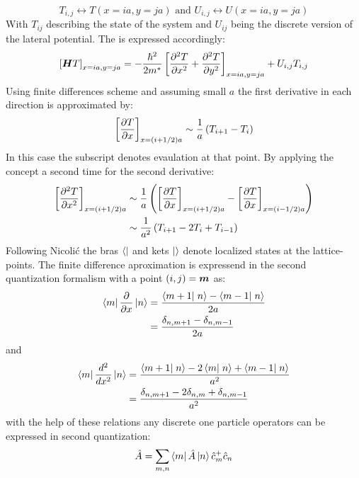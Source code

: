 \begin{equation}
  T_{i,j} \leftrightarrow T(x=ia,y=ja) \mbox{ and } U_{i,j}\leftrightarrow U(x=ia,y=ja)
  \label{FunctionDescrete}
\end{equation}
With $T_{ij}$ describing the state of the system and $U_{ij}$ being the discrete version of the lateral potential.
The \hamil{} is expressed accordingly:
\begin{equation}
  \left[\boldsymbol{H}T\right]_{x=ia,y=ja}=-\frac{\hbar^{2}}{2m^*}\left[\frac{\partial^2 T}{\partial x^2}+\frac{\partial^2 T}{\partial y^2}\right]_{x=ia,y=ja}+U_{i,j}T_{i,j}
  \label{DiscreteHamil}
\end{equation}
Using finite differences scheme and assuming small $a$ the first derivative in each direction is approximated by:
\begin{equation}
  \left[\frac{\partial T}{\partial x}\right]_{x=(i+1/2)a} \sim  \frac{1}{a}\left(T_{i+1}-T_{i}\right)
  \label{ApproximateFirstDerivative}
\end{equation}
In this case the subscript denotes evaulation at that point. By applying the concept a second time for the second derivative:
\begin{align}
  \left[\frac{\partial^2 T}{\partial x^2}\right]_{x=(i+1/2)a} &\sim \frac{1}{a}\left( \left[\frac{\partial T}{\partial x}\right]_{x=(i+1/2)a}-\left[\frac{\partial T}{\partial x}\right]_{x=(i-1/2)a} \right) \\
  &\sim \frac{1}{a^2}\left(T_{i+1}-2T_{i}+T_{i-1}\right)
  \label{ApproximateSecondDerivative}
\end{align}
Following Nicoli\'c \cite{Nikolic2010} the bras $\left<  \right|$ and kets $\left|  \right>$ denote localized states at the lattice-points. The finite difference aproximation is  expressend in the second quantization formalism with a point $(i,j) = \boldsymbol{m}$ as:
\begin{align}
	\bra{m} \pd{}{x} \ket{n} &= \frac{\braket{m+1}{n}-\braket{m-1}{n}}{2a}\\ 
				&= \frac{\delta_{n,m+1}-\delta_{n,m-1}}{2a}
	\label{eqn:finitedifffirstderivative}
\end{align}
and
\begin{align}
	\bra{m} \dd{}{x} \ket{n} &= \frac{\braket{m+1}{n}-2\braket{m}{n}+\braket{m-1}{n}}{a^2} \\
				 &= \frac{\delta_{n,m+1}-2\delta_{n,m}+\delta_{n,m-1}}{a^2}
	\label{eqn:finitediffsecondderivative}
\end{align}
with the help of these relations any discrete one particle operators can be expressed in second quantization:
\begin{align}
	\hat{A} = \sum_{m,n} \left< m \right|\hat{A}\left| n \right> \hat{c}^+_m \hat{c}_n
 \label{eqn:singleparticleopinsecondquantization}
\end{align}

